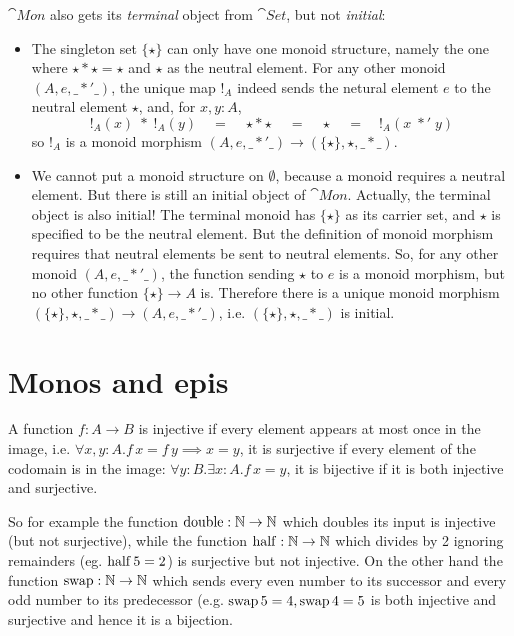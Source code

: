 \begin{Answer}
  $\cat{Mon}$ also gets its \emph{terminal} object from $\cat{Set}$, but not \emph{initial}:
  \begin{itemize}
    \item The singleton set $\{\star\}$ can only have one monoid structure, namely the one where $\star * \star = \star$ and $\star$ as the neutral element. For any other monoid $(A,e,\_*'\_)$, the unique map $!_A$ indeed sends the netural element $e$ to the neutral element $\star$, and, for $x,y\colon A$,
    \[ !_A(x)\;*\;!_A(y) \quad=\quad \star * \star \quad=\quad \star \quad=\quad !_A(x\;*'\;y) \]
    so $!_A$ is a monoid morphism $(A,e,\_*'\_) \to (\{\star\},\star,\_*\_)$.
    \item We cannot put a monoid structure on $\emptyset$, because a monoid requires a neutral element. But there is still an initial object of $\cat{Mon}$. Actually, the terminal object is also initial! The terminal monoid has $\{\star\}$ as its carrier set, and $\star$ is specified to be the neutral element. But the definition of monoid morphism requires that neutral elements be sent to neutral elements. So, for any other monoid $(A,e,\_*'\_)$, the function sending $\star$ to $e$ is a monoid morphism, but no other function $\{\star\}\to A$ is. Therefore there is a unique monoid morphism $(\{\star\},\star,\_*\_)\to (A,e,\_*'\_)$, i.e. $(\{\star\},\star,\_*\_)$ is initial.
  \end{itemize}
\end{Answer}

\section{Monos and epis}
\label{sec:monos-epis}

A function $f:A\to B$ is injective if every element appears at most once in the image, i.e. $\forall x,y:A.f\,x = f\,y \implies x = y$, it is surjective if every element of the codomain is in the image: $\forall y:B.\exists x:A.f\,x = y$, it is bijective if it is both injective and surjective. 

So for example the function $\mathrm{double} : \mathbb{N} \to \mathbb{N}$ which doubles its input is injective (but not surjective), while the function $\mathrm{half} : \mathbb{N} \to \mathbb{N}$ which divides by 2 ignoring remainders (eg. $\mathrm{half}\,5 = 2$) is surjective but not injective. On the other hand the function $\mathrm{swap} : \mathbb{N} \to \mathbb{N}$ which sends every even number to its successor and every odd number to its predecessor (e.g. $\mathrm{swap}\,5 = 4, \mathrm{swap}\,4 = 5$ is both injective and surjective and hence it is a bijection.  

